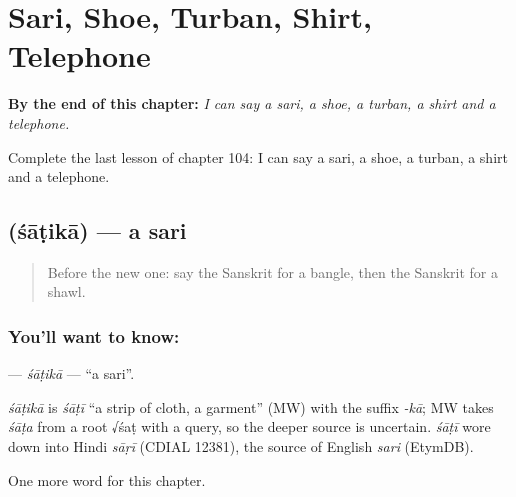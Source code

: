 
\chapter{Sari, Shoe, Turban, Shirt, Telephone}
\label{ch:sa-sari-shoe-turban-shirt-telephone}

\begin{chapteropening}
\textbf{By the end of this chapter:} \emph{I can say a sari, a shoe, a turban, a shirt and a telephone.}

Complete the last lesson of chapter 104: I can say a sari, a shoe, a turban, a shirt and a telephone.
\end{chapteropening}

\section[\texorpdfstring{\sk{शाटिका} (śāṭikā)}{शाटिका (śāṭikā)}]{ (śāṭikā) — a sari}

\label{lesson:SA-C104-satika}



\begin{quote}
Before the new one: say the Sanskrit for a bangle, then the Sanskrit for a shawl.
\end{quote}

\subsection*{You'll want to know: }
\textbf{} — \emph{śāṭikā} — \textquotedblleft{}a sari\textquotedblright{}.

\begin{cousinweb}
\emph{śāṭikā} is \emph{śāṭī} \textquotedblleft{}a strip of cloth, a garment\textquotedblright{} (MW) with the suffix \emph{-kā}; MW takes \emph{śāṭa} from a root √śaṭ with a query, so the deeper source is uncertain. \emph{śāṭī} wore down into Hindi \emph{sāṛī} (CDIAL 12381), the source of English \emph{sari} (EtymDB).
\end{cousinweb}

\begin{grammarlens}[title={What you've built}]
One more word for this chapter.
\end{grammarlens}

